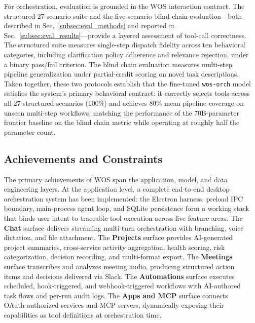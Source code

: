 \documentclass[conference]{IEEEtran}
\begin{document}
For orchestration, evaluation is grounded in the WOS interaction contract. The structured 27-scenario suite and the five-scenario blind-chain evaluation---both described in Sec.~\ref{subsec:eval_methods} and reported in Sec.~\ref{subsec:eval_results}---provide a layered assessment of tool-call correctness. The structured suite measures single-step dispatch fidelity across ten behavioral categories, including clarification policy adherence and relevance rejection, under a binary pass/fail criterion. The blind chain evaluation measures multi-step pipeline generalization under partial-credit scoring on novel task descriptions. Taken together, these two protocols establish that the fine-tuned \texttt{wos-orch} model satisfies the system's primary behavioral contract: it correctly selects tools across all 27 structured scenarios (100\%) and achieves 80\% mean pipeline coverage on unseen multi-step workflows, matching the performance of the 70B-parameter frontier baseline on the blind chain metric while operating at roughly half the parameter count.
\subsection{Achievements and Constraints}
The primary achievements of WOS span the application, model, and data engineering layers. At the application level, a complete end-to-end desktop orchestration system has been implemented: the Electron harness, preload IPC boundary, main-process agent loop, and SQLite persistence form a working stack that binds user intent to traceable tool execution across five feature areas. The \textbf{Chat} surface delivers streaming multi-turn orchestration with branching, voice dictation, and file attachment. The \textbf{Projects} surface provides AI-generated project summaries, cross-service activity aggregation, health scoring, risk categorization, decision recording, and multi-format export. The \textbf{Meetings} surface transcribes and analyzes meeting audio, producing structured action items and decisions delivered via Slack. The \textbf{Automations} surface executes scheduled, hook-triggered, and webhook-triggered workflows with AI-authored task flows and per-run audit logs. The \textbf{Apps and MCP} surface connects OAuth-authorized services and MCP servers, dynamically exposing their capabilities as tool definitions at orchestration time.
\end{document}
